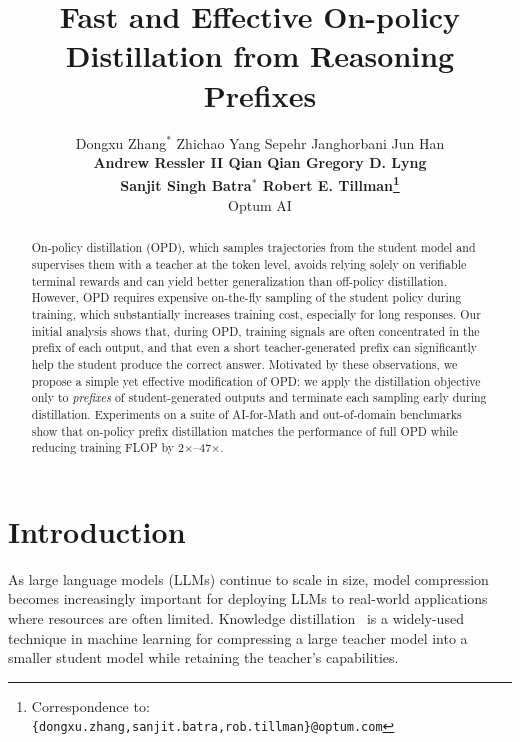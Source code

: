 \documentclass[11pt]{article}
\title{Fast and Effective On-policy Distillation from Reasoning Prefixes}
\author{  
  Dongxu Zhang$^{\ast}$ \quad Zhichao Yang \quad Sepehr Janghorbani \quad Jun Han \\
  \textbf{Andrew Ressler II \quad Qian Qian \quad Gregory D. Lyng } \\  
  \textbf{ Sanjit Singh Batra$^{\ast}$ \quad Robert E. Tillman\thanks{Correspondence to:\newline 
  \texttt{\{{dongxu.zhang,sanjit.batra,rob.tillman}\}@optum.com}
}}\\
Optum AI
}
\begin{document}
  
\maketitle  
  
\begin{abstract}  

On-policy distillation (OPD), which samples trajectories from the student model and supervises them with a teacher at the token level, avoids relying solely on verifiable terminal rewards and can yield better generalization than off-policy distillation. However, OPD requires expensive on-the-fly sampling of the student policy during training, which substantially increases training cost, especially for long responses. Our initial analysis shows that, during OPD, training signals are often concentrated in the prefix of each output, and that even a short teacher-generated prefix can significantly help the student produce the correct answer. Motivated by these observations, we propose a simple yet effective modification of OPD: we apply the distillation objective only to \emph{prefixes} of student-generated outputs and terminate each sampling early during distillation. Experiments on a suite of AI-for-Math and out-of-domain benchmarks show that on-policy prefix distillation matches the performance of full OPD while reducing training FLOP by 2×–47×.
\end{abstract}  
  
  

\section{Introduction}  
As large language models (LLMs) continue to scale in size, model compression~\cite{buciluǎ2006model} becomes increasingly important for deploying LLMs to real-world applications where resources are often limited.  
Knowledge distillation~\cite{hinton2015distilling} is a widely-used technique in machine learning for compressing a large teacher model into a smaller student model while retaining the teacher's capabilities.  
  
\end{document}
